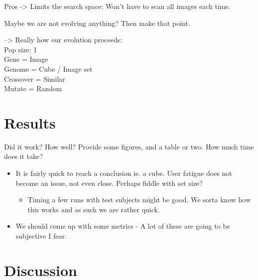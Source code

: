 \documentclass[]{article}
\begin{document}
Pros ->  Limits the search space:  Won’t have to scan all images each time.

Maybe we are not evolving anything?  Then make that point.

--> Really how our evolution proceeds:\\
Pop size: 1\\
Gene = Image\\
Genome = Cube / Image set\\
Crossover = Similar\\
Mutate = Random

\section{Results}
\label{sec:Results}
\begin{framed}
Did it work? How well? Provide some figures, and a table or two. How much time does it take?
\end{framed}
\begin{itemize}
\item It is fairly quick to reach a conclusion ie. a cube. User fatigue does not become an issue, not even close. Perhaps fiddle with set size?
	\begin{itemize}
	\item Timing a few runs with test subjects might be good. We sorta know how this works and as such we are rather quick.
	\end{itemize}
\item We should come up with some metrics - A lot of these are going to be subjective I fear.
\end{itemize}



\section{Discussion}
\label{sec:Discussion}
\end{document}
